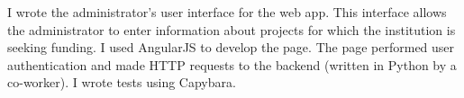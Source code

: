 I wrote the administrator's user interface for the web app. This interface allows the administrator to enter information about projects for which the institution is seeking funding. I used AngularJS to develop the page. The page performed user authentication and made HTTP requests to the backend (written in Python by a co-worker). I wrote tests using Capybara.
